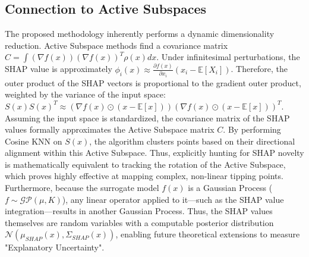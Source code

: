 \documentclass[sn-mathphys]{sn-jnl}
\theoremstyle{thmstyleone}%
\theoremstyle{thmstyletwo}%
\theoremstyle{thmstylethree}%
\begin{document}
\subsection{Connection to Active Subspaces}
The proposed methodology inherently performs a dynamic dimensionality reduction. Active Subspace methods find a covariance matrix $C = \int (\nabla f(x))(\nabla f(x))^T \rho(x) dx$. Under infinitesimal perturbations, the SHAP value is approximately $\phi_i(x) \approx \frac{\partial f(x)}{\partial x_i} (x_i - \mathbb{E}[X_i])$. Therefore, the outer product of the SHAP vectors is proportional to the gradient outer product, weighted by the variance of the input space: $S(x)S(x)^T \approx (\nabla f(x) \odot (x - \mathbb{E}[x])) (\nabla f(x) \odot (x - \mathbb{E}[x]))^T$. Assuming the input space is standardized, the covariance matrix of the SHAP values formally approximates the Active Subspace matrix $C$. By performing Cosine KNN on $S(x)$, the algorithm clusters points based on their directional alignment within this Active Subspace. Thus, explicitly hunting for SHAP novelty is mathematically equivalent to tracking the rotation of the Active Subspace, which proves highly effective at mapping complex, non-linear tipping points. Furthermore, because the surrogate model $f(x)$ is a Gaussian Process ($f \sim \mathcal{GP}(\mu, K)$), any linear operator applied to it—such as the SHAP value integration—results in another Gaussian Process. Thus, the SHAP values themselves are random variables with a computable posterior distribution $\mathcal{N}(\mu_{SHAP}(x), \Sigma_{SHAP}(x))$, enabling future theoretical extensions to measure "Explanatory Uncertainty".
\end{document}
